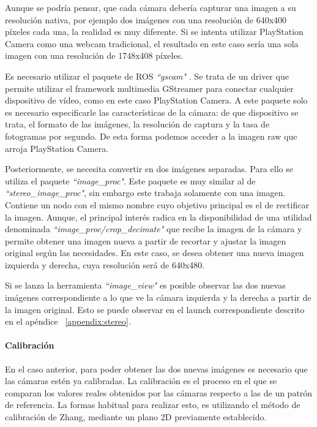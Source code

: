 Aunque se podría pensar, que cada cámara debería capturar una imagen a su
resolución nativa, por ejemplo dos imágenes con una resolución de 640x400
píxeles cada una, la realidad es muy diferente. Si se intenta utilizar
PlayStation Camera como una webcam tradicional, el resultado en este caso sería
una sola imagen con una resolución de 1748x408 píxeles.

Es necesario utilizar el paquete de ROS \textit{``gscam"} \cite{PackageGscam}.
Se trata de un driver que permite utilizar el framework multimedia GStreamer
para conectar cualquier dispositivo de vídeo, como en este caso PlayStation
Camera. A este paquete solo es necesario especificarle las características de la
cámara: de que dispositivo se trata, el formato de las imágenes, la resolución
de captura y la tasa de fotogramas por segundo. De esta forma podemos acceder a
la imagen raw que arroja PlayStation Camera.

Posteriormente, se necesita convertir en dos imágenes separadas. Para ello se
utiliza el paquete \textit{``image\_proc"}. Este paquete es muy similar al de
\textit{``stereo\_image\_proc"}, sin embargo este trabaja solamente con una
imagen. Contiene un nodo con el mismo nombre cuyo objetivo principal es el de
rectificar la imagen. Aunque, el principal interés radica en la disponibilidad
de una utilidad denominada \textit{``image\_proc/crop\_decimate"}
\cite{PackageCropDecimate} que recibe la imagen de la cámara y permite obtener
una imagen nueva a partir de recortar y ajustar la imagen original según las
necesidades. En este caso, se desea obtener una nueva imagen izquierda y
derecha, cuya resolución será de 640x480.

Si se lanza la herramienta \textit{``image\_view"} es posible observar las dos
nuevas imágenes correspondiente a lo que ve la cámara izquierda y la derecha a
partir de la imagen original. Esto se puede observar en el launch
correspondiente descrito en el apéndice ~\ref{appendix:stereo}.

\paragraph{Calibración} \hspace{0pt}

En el caso anterior, para poder obtener las dos nuevas imágenes es necesario que
las cámaras estén ya calibradas. La calibración es el proceso en el que se
comparan los valores reales obtenidos por las cámaras respecto a las de un
patrón de referencia. La formas habitual para realizar esto, es utilizando el
método de calibración de Zhang, mediante un plano 2D previamente establecido. 

